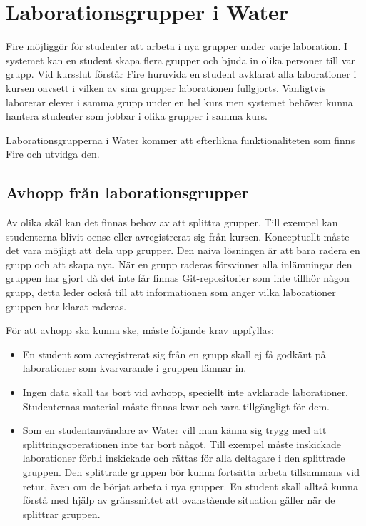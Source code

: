 \section{Laborationsgrupper i Water}

Fire möjliggör för studenter att arbeta i nya grupper under varje laboration. I systemet kan en student skapa flera grupper och bjuda in olika personer till var grupp. Vid kursslut förstår Fire huruvida en student avklarat alla laborationer i kursen oavsett i vilken av sina grupper laborationen fullgjorts. Vanligtvis laborerar elever i samma grupp under en  hel kurs men systemet behöver kunna hantera studenter som jobbar i olika grupper i samma kurs.

Laborationsgrupperna i Water kommer att efterlikna funktionaliteten som finns Fire och utvidga den.

\subsection{Avhopp från laborationsgrupper}

Av olika skäl kan det finnas behov av att splittra grupper. Till exempel kan
studenterna blivit oense eller avregistrerat sig från kursen. Konceptuellt
måste det vara möjligt att dela upp grupper. Den naiva lösningen är att bara
radera en grupp och att skapa nya. När en grupp raderas försvinner alla
inlämningar den gruppen har gjort då det inte får finnas Git-repositorier som
inte tillhör någon grupp, detta leder också till att informationen som anger
vilka laborationer gruppen har klarat raderas.

För att avhopp ska kunna ske, måste följande krav uppfyllas:
\begin{itemize}
  \item En student som avregistrerat sig från en grupp skall ej få godkänt på laborationer som kvarvarande i gruppen lämnar in.
  \item Ingen data skall tas bort vid avhopp, speciellt inte avklarade laborationer. Studenternas material måste finnas kvar och vara tillgängligt för dem.
  \item Som en studentanvändare av Water vill man känna sig trygg med att
    splittringsoperationen inte tar bort något. Till exempel måste inskickade
    laborationer förbli inskickade och rättas för alla deltagare i den
    splittrade gruppen. Den splittrade gruppen bör kunna fortsätta arbeta
    tillsammans vid retur, även om de börjat arbeta i nya grupper. En student
    skall alltså kunna förstå med hjälp av gränssnittet att ovanstående
    situation gäller när de splittrar gruppen.
\end{itemize}


